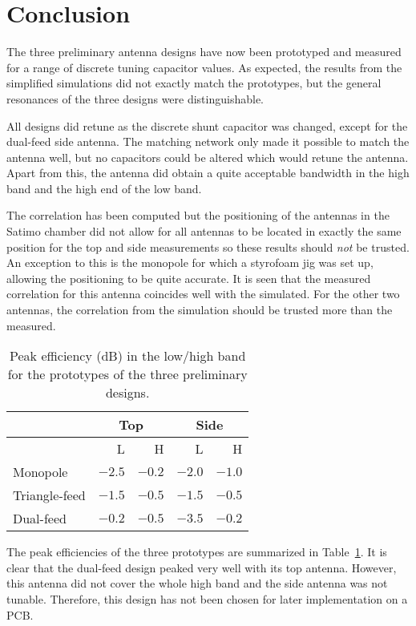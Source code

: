 \section{Conclusion}
The three preliminary antenna designs have now been prototyped and measured for a range of discrete tuning capacitor values. As expected, the results from the simplified simulations did not exactly match the prototypes, but the general resonances of the three designs were distinguishable.

All designs did retune as the discrete shunt capacitor was changed, except for the dual-feed side antenna. The matching network only made it possible to match the antenna well, but no capacitors could be altered which would retune the antenna. Apart from this, the antenna did obtain a quite acceptable bandwidth in the high band and the high end of the low band.

The correlation has been computed but the positioning of the antennas in the Satimo chamber did not allow for all antennas to be located in exactly the same position for the top and side measurements so these results should \emph{not} be trusted. An exception to this is the monopole for which a styrofoam jig was set up, allowing the positioning to be quite accurate. It is seen that the measured correlation for this antenna coincides well with the simulated. For the other two antennas, the correlation from the simulation should be trusted more than the measured.

\begin{table}[htbp]
    \centering
    \begin{tabular}{|l|r|r|r|r|}
        \hline
        & \multicolumn{2}{c|}{Top} & \multicolumn{2}{c|}{Side} \\
        \hline
        & L & H & L & H \\
        \hline
        Monopole & $-2.5$ & $-0.2$ & $-2.0$ & $-1.0$ \\
        Triangle-feed & $-1.5$ & $-0.5$ & $-1.5$ & $-0.5$ \\
        Dual-feed & $-0.2$ & $-0.5$ & $-3.5$ & $-0.2$ \\
        \hline
    \end{tabular}
    \caption{Peak efficiency (dB) in the low/high band for the prototypes of the three preliminary designs.}
    \label{tab:peakefficiencyproto}
\end{table}

The peak efficiencies of the three prototypes are summarized in Table~\ref{tab:peakefficiencyproto}. It is clear that the dual-feed design peaked very well with its top antenna. However, this antenna did not cover the whole high band and the side antenna was not tunable. Therefore, this design has not been chosen for later implementation on a PCB.

